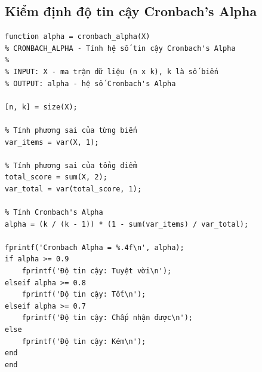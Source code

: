 \subsection{Kiểm định độ tin cậy Cronbach's Alpha}

\begin{matlab}
\begin{lstlisting}
function alpha = cronbach_alpha(X)
% CRONBACH_ALPHA - Tính hệ số tin cậy Cronbach's Alpha
%
% INPUT: X - ma trận dữ liệu (n x k), k là số biến
% OUTPUT: alpha - hệ số Cronbach's Alpha

[n, k] = size(X);

% Tính phương sai của từng biến
var_items = var(X, 1);

% Tính phương sai của tổng điểm
total_score = sum(X, 2);
var_total = var(total_score, 1);

% Tính Cronbach's Alpha
alpha = (k / (k - 1)) * (1 - sum(var_items) / var_total);

fprintf('Cronbach Alpha = %.4f\n', alpha);
if alpha >= 0.9
    fprintf('Độ tin cậy: Tuyệt vời\n');
elseif alpha >= 0.8
    fprintf('Độ tin cậy: Tốt\n');
elseif alpha >= 0.7
    fprintf('Độ tin cậy: Chấp nhận được\n');
else
    fprintf('Độ tin cậy: Kém\n');
end
end
\end{lstlisting}
\end{matlab}

